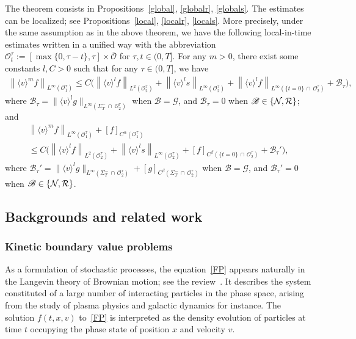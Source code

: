 \documentclass[AHL,Unicode,longabstracts,published]{cedram}
\newcommand*\NN {{\mathcal{N}\hspace{-.3mm}}}
\newcommand*\Gi {\mathcal{G}}
\newcommand*\BB {\mathscr{B}}
\newcommand{\clB}{\mathcal{B}}
\newcommand*\RR {\mathcal{R}}
\newcommand*\OO {\mathcal{O}}
\newcommand{\lv}{\langle v\rangle}
\begin{document}
\begin{rema}
The theorem consists in Propositions~\ref{global}, \ref{globalr}, \ref{globals}. The estimates can be localized; see Propositions~\ref{local}, \ref{localr}, \ref{locals}. More precisely, under the same assumption as in the above theorem, we have the following local-in-time estimates written in a unified way with the abbreviation $\OO_t^\tau:=[\max\{0,\tau-t\},\tau]\times\overline{\OO}$ for $\tau,t\in(0,T]$. For any $m>0$, there exist some constants $l,C>0$ such that for any $\tau\in(0,T]$, we have
\begin{align*}
\left\|\lv^mf\right\|_{L^\infty(\OO_1^\tau)}
\le C \big(\left\|\lv^{l} f\right\|_{L^2(\OO_2^\tau)}+ \left\|\lv^{l}s\right\|_{L^\infty(\OO_2^\tau)}+ \left\|\lv^{l}f\right\|_{L^\infty\left(\{t=0\}\,\cap\,\OO_2^\tau\right)} +\clB_\tau \big),
\end{align*}
where $\clB_\tau=\|\lv^lg\|_{L^\infty(\Sigma_T^-\,\cap\,\OO_2^\tau)}$ when $\BB=\Gi$, and $\clB_\tau=0$ when $\BB\in\{\NN,\RR\}$; and
\begin{multline*}
\left\|\lv^mf\right\|_{L^\infty(\OO_1^\tau)} + [f]_{C^\alpha(\OO_1^\tau)}\\
\le C\big(\left\|\lv^{l} f\right\|_{L^2(\OO_2^\tau)}+ \left\|\lv^ls\right\|_{L^\infty(\OO_2^\tau)} +[f]_{C^\beta\left(\{t=0\}\,\cap\,\OO_2^\tau\right)} +\clB_\tau' \big),
\end{multline*}
where $\clB_\tau'=\|\lv^lg\|_{L^\infty(\Sigma_T^-\,\cap\,\OO_2^\tau)}+[g]_{C^\beta(\Sigma_T^-\,\cap\,\OO_2^\tau)}$ when $\BB=\Gi$, and $\clB_\tau'=0$ when $\BB\in\{\NN,\RR\}$.
\end{rema}

\subsection{Backgrounds and related work}
\subsubsection{Kinetic boundary value problems} 

As a formulation of stochastic processes, the equation~\eqref{FP} appears naturally in the Langevin theory of Brownian motion; see the review~\cite{Chand}. It describes the system constituted of a large number of interacting particles in the phase space, arising from the study of plasma physics and galactic dynamics for instance. The solution $f(t,x,v)$ to~\eqref{FP} is interpreted as the density evolution of particles at time $t$ occupying the phase state of position $x$ and velocity $v$.
\end{document}
